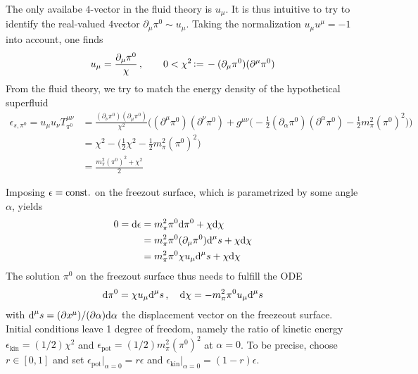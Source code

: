 The only availabe $4$-vector in the fluid theory is $u_\mu$. It is thus intuitive to try to identify the real-valued $4$vector $\partial_\mu\pi^0\sim u_\mu$. Taking the normalization $u_\mu u^\mu=-1$ into account, one finds
\begin{equation}
    u_\mu=\frac{\partial_\mu\pi^0}{\chi}\,,\qquad0<\chi^2{\,\vcentcolon=\,}-(\partial_\mu\pi^0)(\partial^\mu\pi^0)
\end{equation}
From the fluid theory, we try to match the energy density of the hypothetical superfluid
\begin{subequations}
    \begin{align}
        \epsilon_{s,\pi^0}=u_\mu u_\nu T^{\mu\nu}_{\pi^0}&=\frac{(\partial_\nu\pi^0)(\partial_\mu\pi^0)}{\chi^2}\Big((\partial^\mu\pi^0)(\partial^\nu\pi^0)+g^{\mu\nu}\big(-\frac{1}{2}(\partial_\alpha\pi^0)(\partial^\alpha\pi^0)-\frac{1}{2}m_\pi^2(\pi^0)^2\big)\Big)\\
        &=\chi^2-\big(\frac{1}{2}\chi^2-\frac{1}{2}m_\pi^2(\pi^0)^2\big)\\
        &=\frac{m_\pi^2(\pi^0)^2+\chi^2}{2}
    \end{align}
\end{subequations}

Imposing $\epsilon={\text{const.}}$ on the freezout surface, which is parametrized by some angle $\alpha$, yields
\begin{subequations}
    \begin{align}
        0=\text{d}\epsilon&=m_\pi^2\pi^0\text{d}\pi^0+\chi\text{d}\chi\\
        &=m_\pi^2\pi^0(\partial_\mu\pi^0)\text{d}^\mu s+\chi\text{d}\chi\\
        &=m_\pi^2\pi^0\chi u_\mu\text{d}^\mu s+\chi\text{d}\chi
    \end{align}
\end{subequations}
The solution $\pi^0$ on the freezout surface thus needs to fulfill the ODE
    \begin{equation}
        \text{d}\pi^0=\chi u_\mu\text{d}^\mu s\,,\quad
        \text{d}\chi=-m_\pi^2\pi^0 u_\mu\text{d}^\mu s
    \end{equation}
    with $\text{d}^\mu s=(\partial x^\mu)/(\partial\alpha)\text{d}\alpha$ the displacement vector on the freezeout surface. Initial conditions leave 1 degree of freedom, namely the ratio of kinetic energy $\epsilon_{\text{kin}}=(1/2)\chi^2$ and $\epsilon_{\text{pot}}=(1/2)m_\pi^2(\pi^0)^2$ at $\alpha=0$. To be precise, choose $r\in[0,1]$ and set $\epsilon_{\text{pot}}\big\vert_{\alpha=0}=r\epsilon$ and $\epsilon_{\text{kin}}\big\vert_{\alpha=0}=(1-r)\epsilon$.

